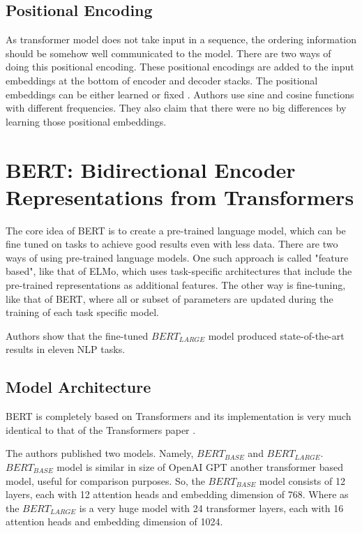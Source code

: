 \documentclass{article}
\begin{document}
\subsection{Positional Encoding}
As transformer model does not take input in a sequence, the ordering information should be somehow well communicated to the model. There are two ways of doing this positional encoding. These positional encodings are added to the input embeddings at the bottom of encoder and decoder stacks. The positional embeddings can be either learned or fixed \cite{DBLP:journals/corr/GehringAGYD17}. Authors use sine and cosine functions with different frequencies. They also claim that there were no big differences by learning those positional embeddings.

\section{BERT: Bidirectional Encoder Representations from Transformers}

The core idea of BERT is to create a pre-trained language model, which can be fine tuned on tasks to achieve good results even with less data. There are two ways of using pre-trained language models. One such approach is called "feature based", like that of ELMo, which uses task-specific architectures that include the pre-trained representations as additional features. The other way is fine-tuning, like that of BERT, where all or subset of parameters are updated during the training of each task specific model. 

Authors show that the fine-tuned $BERT_{LARGE}$ model produced state-of-the-art results in eleven NLP tasks.

\subsection{Model Architecture}
BERT is completely based on Transformers and its implementation is very much identical to that of the Transformers paper \cite{vaswani2017attention}. 

The authors published two models. Namely, $BERT_{BASE}$ and $BERT_{LARGE}$.
$BERT_{BASE}$ model is similar in size of OpenAI GPT \cite{radford2018improving} another transformer based model, useful for comparison purposes. So, the $BERT_{BASE}$ model consists of 12 layers, each with 12 attention heads and embedding dimension of 768. Where as the $BERT_{LARGE}$ is a very huge model with 24 transformer layers, each with 16 attention heads and embedding dimension of 1024.
\end{document}
